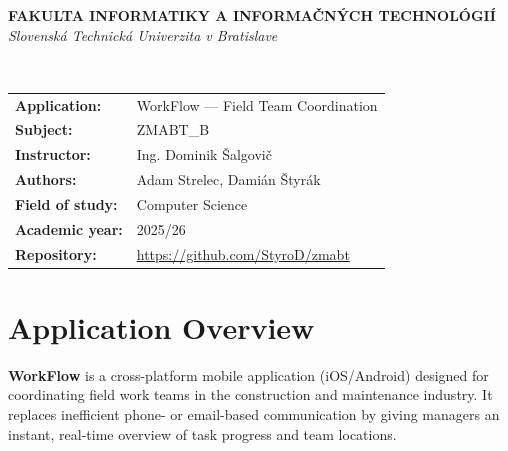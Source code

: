 \documentclass[12pt,a4paper]{article}
\begin{document}
\begin{titlepage}
\begin{center}
    \textbf{\large FAKULTA INFORMATIKY A INFORMAČNÝCH TECHNOLÓGIÍ}\\[0.2cm]
    \textit{Slovenská Technická Univerzita v Bratislave}\\[3cm]

    \\[3cm]

    \begin{tabular}{ll}
        \textbf{Application:} & WorkFlow --- Field Team Coordination \\[0.3cm]
        \textbf{Subject:}     & ZMABT\_B \\[0.3cm]
        \textbf{Instructor:}  & Ing. Dominik Šalgovič \\[0.3cm]
        \textbf{Authors:}     & Adam Strelec, Damián Štyrák \\[0.3cm]
        \textbf{Field of study:} & Computer Science \\[0.3cm]
        \textbf{Academic year:} & 2025/26 \\[0.3cm]
        \textbf{Repository:}  & \url{https://github.com/StyroD/zmabt} \\
    \end{tabular}
\end{center}
\end{titlepage}

\tableofcontents
\newpage

\section{Application Overview}

\textbf{WorkFlow} is a cross-platform mobile application (iOS/Android) designed for coordinating field work teams in the construction and maintenance industry. It replaces inefficient phone- or email-based communication by giving managers an instant, real-time overview of task progress and team locations.
\end{document}
